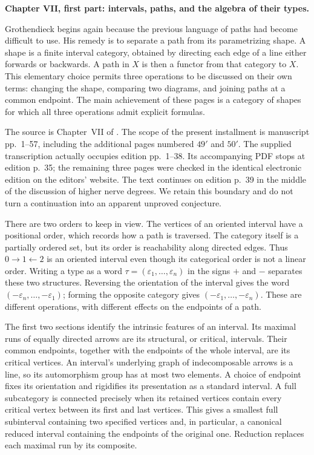 \begingroup
{}
\noindent\textbf{Chapter VII, first part: intervals, paths, and the algebra of their types.}

Grothendieck begins again because the previous language of paths had become difficult to use. His remedy is to separate a path from its parametrizing shape. A shape is a finite interval category, obtained by directing each edge of a line either forwards or backwards. A path in $X$ is then a functor from that category to $X$. This elementary choice permits three operations to be discussed on their own terms: changing the shape, comparing two diagrams, and joining paths at a common endpoint. The main achievement of these pages is a category of shapes for which all three operations admit explicit formulas.

The source is Chapter~VII of \citet{GrothendieckDerivateursVII}. The scope of the present installment is manuscript pp.~1--57, including the additional pages numbered $49'$ and $50'$. The supplied transcription actually occupies edition pp.~1--38. Its accompanying PDF stops at edition p.~35; the remaining three pages were checked in the identical electronic edition on the editors' website. The text continues on edition p.~39 in the middle of the discussion of higher nerve degrees. We retain this boundary and do not turn a continuation into an apparent unproved conjecture.

There are two orders to keep in view. The vertices of an oriented interval have a positional order, which records how a path is traversed. The category itself is a partially ordered set, but its order is reachability along directed edges. Thus $0\to1\leftarrow2$ is an oriented interval even though its categorical order is not a linear order. Writing a type as a word $\tau=(\varepsilon_1,\ldots,\varepsilon_n)$ in the signs $+$ and $-$ separates these two structures. Reversing the orientation of the interval gives the word $(-\varepsilon_n,\ldots,-\varepsilon_1)$; forming the opposite category gives $(-\varepsilon_1,\ldots,-\varepsilon_n)$. These are different operations, with different effects on the endpoints of a path.

The first two sections identify the intrinsic features of an interval. Its maximal runs of equally directed arrows are its structural, or critical, intervals. Their common endpoints, together with the endpoints of the whole interval, are its critical vertices. An interval's underlying graph of indecomposable arrows is a line, so its automorphism group has at most two elements. A choice of endpoint fixes its orientation and rigidifies its presentation as a standard interval. A full subcategory is connected precisely when its retained vertices contain every critical vertex between its first and last vertices. This gives a smallest full subinterval containing two specified vertices and, in particular, a canonical reduced interval containing the endpoints of the original one. Reduction replaces each maximal run by its composite.

